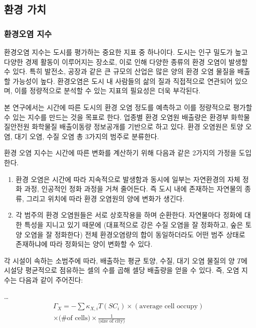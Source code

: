 \documentclass[10pt]{article}
\begin{document}
\begin{multicols}{2}
\subsection{환경 가치}

\subsubsection{환경오염 지수}
환경오염 지수는 도시를 평가하는 중요한 지표 중 하나이다. 도시는 인구 밀도가 높고 다양한 경제 활동이 이루어지는 장소로, 이로 인해 다양한 종류의 환경 오염이 발생할 수 있다. 특히 발전소, 공장과 같은 큰 규모의 산업은 많은 양의 환경 오염 물질을 배출할 가능성이 높다. 환경오염은 도시 내 사람들의 삶의 질과 직접적으로 연관되어 있으며, 이를 정량적으로 분석할 수 있는 지표의 필요성은 더욱 부각된다.

본 연구에서는 시간에 따른 도시의 환경 오염 정도를 예측하고 이를 정량적으로 평가할 수 있는 지수를 만드는 것을 목표로 한다. 업종별 환경 오염원 배출량은 환경부 화학물질안전원 화학물질 배출이동량 정보공개\cite{icisdata2021}를 기반으로 하고 있다. 환경 오염원은 토양 오염, 대기 오염, 수질 오염 총 3가지의 범주로 분류한다.

환경 오염 지수는 시간에 따른 변화를 계산하기 위해 다음과 같은 2가지의 가정을 도입한다.
\begin{enumerate}
    \item 환경 오염은 시간에 따라 지속적으로 발생함과 동시에 일부는 자연환경의 자체 정화 과정, 인공적인 정화 과정을 거쳐 줄어든다. 즉 도시 내에 존재하는 자연물의 종류, 그리고 위치에 따라 환경 오염원의 양에 변화가 생긴다.
    \item 각 범주의 환경 오염원들은 서로 상호작용을 하며 순환한다. 자연물마다 정화에 대한 특성을 지니고 있기 때문에 (대표적으로 강은 수질 오염을 잘 정화하고, 숲은 토양 오염을 잘 정화한다) 전체 환경오염량의 합이 동일하더라도 어떤 범주 상태로 존재하냐에 따라 정화되는 양이 변화할 수 있다.
\end{enumerate}

각 시설이 속하는 소범주에 따라, 배출하는 평균 토양, 수질, 대기 오염 물질의 양 $T$에 시설당 평균적으로 점유하는 셀의 수를 곱해 셀당 배출량을 얻을 수 있다. 즉, 오염 지수는 다음과 같이 주어진다:

\ldots
\begin{multline}
\Gamma_{X} = - \sum \kappa_{X, i} T({SC}_i) \times (\text{average cell occupy})\\
\times \text{(\# of cells)} \times \frac{1}{\text{(size of city)}}
\end{multline}


\end{multicols}
\end{document}
